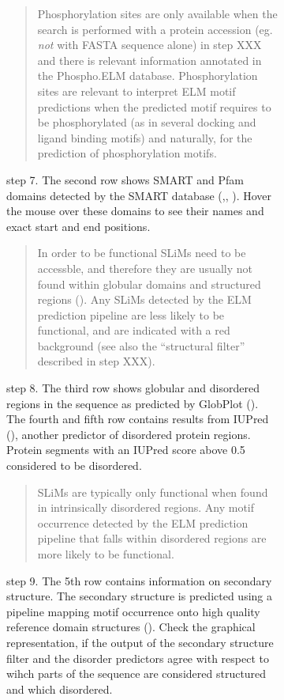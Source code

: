 {\begin{figure}[h!]
{{\begin{figure}[h!]
{{\begin{quote}
Phosphorylation sites are only available when the search is performed
with a protein accession (eg. \emph{not} with FASTA sequence alone) in
step XXX and there is relevant information annotated in the Phospho.ELM
database. Phosphorylation sites are relevant to interpret ELM motif
predictions when the predicted motif requires to be phosphorylated (as
in several docking and ligand binding motifs) and naturally, for the
prediction of phosphorylation motifs.
\end{quote}

step 7. The second row shows SMART and Pfam domains detected by the
SMART database (\cite{9600884},\cite{25300481}, \cite{9600884}). Hover
the mouse over these domains to see their names and exact start and end
positions.

\begin{quote}
In order to be functional SLiMs need to be accessble, and therefore they
are usually not found within globular domains and structured regions
(\cite{21909575}). Any SLiMs detected by the ELM prediction pipeline are
less likely to be functional, and are indicated with a red background
(see also the ``structural filter'' described in step XXX).
\end{quote}

step 8. The third row shows globular and disordered regions in the
sequence as predicted by GlobPlot (\cite{12824398}). The fourth and
fifth row contains results from IUPred (\cite{15955779}), another
predictor of disordered protein regions. Protein segments with an IUPred
score above 0.5 considered to be disordered.

\begin{quote}
SLiMs are typically only functional when found in intrinsically
disordered regions. Any motif occurrence detected by the ELM prediction
pipeline that falls within disordered regions are more likely to be
functional.
\end{quote}

step 9. The 5th row contains information on secondary structure. The
secondary structure is predicted using a pipeline mapping motif
occurrence onto high quality reference domain structures
(\cite{19852836}). Check the graphical representation, if the output of
the secondary structure filter and the disorder predictors agree with
respect to wihch parts of the sequence are considered structured and
which disordered.

}}
\end{figure}}}
\end{figure}}
